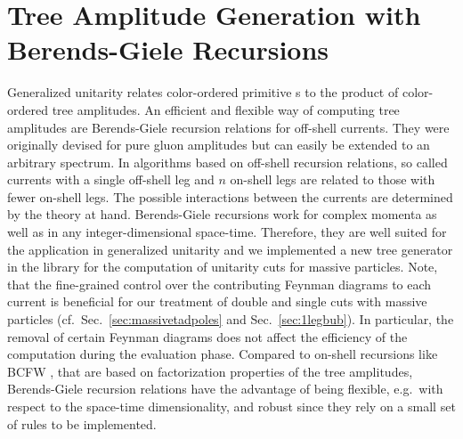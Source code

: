 \section{Tree Amplitude Generation with Berends-Giele Recursions}
\label{sec:BGrec}
Generalized unitarity relates color-ordered primitive \ola s to the
product of color-ordered tree
amplitudes. An efficient and flexible way of computing tree amplitudes are
Berends-Giele recursion relations \cite{Berends:1987me} for off-shell
currents. They were originally
devised for pure gluon amplitudes but can easily be extended to an
arbitrary spectrum. In algorithms based on off-shell recursion
relations, so called currents with a single off-shell leg and $n$ on-shell legs
are related to those with fewer on-shell legs. The possible
interactions between the currents are determined by the
theory at hand. Berends-Giele recursions work for complex
momenta as well as in any integer-dimensional space-time. Therefore, they are well suited for the
application in generalized unitarity and we implemented a new tree
generator in the \BlackHat{} library for the computation of unitarity
cuts for massive particles. Note, that
the fine-grained control over the contributing Feynman diagrams to each
current is beneficial for our treatment of double and single cuts with
massive particles (cf.~Sec.~\ref{sec:massivetadpoles} and
Sec.~\ref{sec:1legbub}). In particular, the removal of certain Feynman
diagrams does not affect the
efficiency of the computation during the evaluation phase. Compared to on-shell recursions like BCFW
\cite{Britto2005c,Britto2005f}, that are based on factorization
properties of the tree amplitudes, Berends-Giele recursion relations have the
advantage of being flexible, e.g.~with respect to the space-time
dimensionality, and robust since they rely on a small set of rules to be
implemented.

